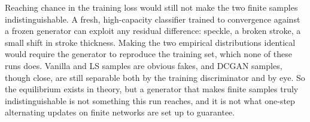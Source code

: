 Reaching chance in the training loss would still not make the two finite samples indistinguishable. A fresh, high-capacity classifier trained to convergence against a frozen generator can exploit any residual difference: speckle, a broken stroke, a small shift in stroke thickness. Making the two empirical distributions identical would require the generator to reproduce the training set, which none of these runs does. Vanilla and LS samples are obvious fakes, and DCGAN samples, though close, are still separable both by the training discriminator and by eye. So the equilibrium exists in theory, but a generator that makes finite samples truly indistinguishable is not something this run reaches, and it is not what one-step alternating updates on finite networks are set up to guarantee.
